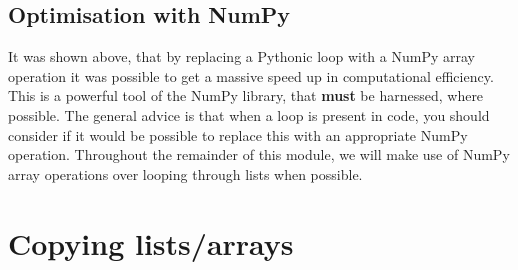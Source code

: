\documentclass[a4paper]{article}
\begin{document}
\subsection{Optimisation with NumPy}

It was shown above, that by replacing a Pythonic loop with a NumPy array operation it was possible to get a massive speed up in computational efficiency.
This is a powerful tool of the NumPy library, that \textbf{must} be harnessed, where possible.
The general advice is that when a loop is present in code, you should consider if it would be possible to replace this with an appropriate NumPy operation.
Throughout the remainder of this module, we will make use of NumPy array operations over looping through lists when possible.
\vspace{\baselineskip}
\begin{center}
	\noindent{}
\end{center}

\section{Copying lists/arrays}
\end{document}
